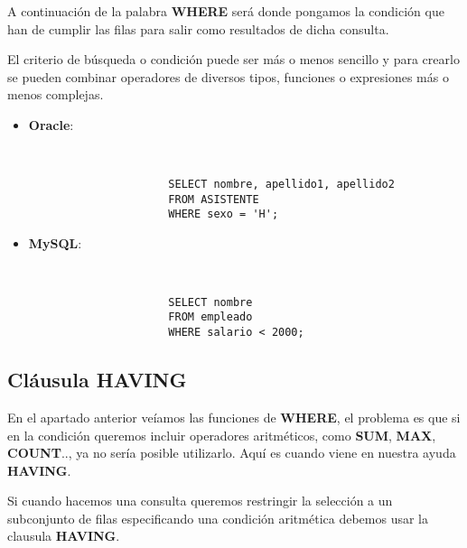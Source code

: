 A continuación de la palabra \textbf{WHERE} será donde pongamos la condición que han de cumplir las filas para salir  como resultados de dicha consulta.

El criterio de búsqueda o condición puede ser más o menos sencillo y para crearlo se pueden combinar operadores de diversos tipos, funciones o expresiones más o menos complejas.

\begin{itemize}
    \item \textbf{Oracle}:

    \begin{figure}[H]
        \begin{tcolorbox}[sharp corners, colback=yellow!30, colframe=white!20]
            \scriptsize
            \begin{verbatim}


                SELECT nombre, apellido1, apellido2
                FROM ASISTENTE
                WHERE sexo = 'H';
            \end{verbatim}
        \end{tcolorbox}
    \end{figure}

    \item \textbf{MySQL}:

    \begin{figure}[H]
        \begin{tcolorbox}[sharp corners, colback=yellow!30, colframe=white!20]
            \scriptsize
            \begin{verbatim}


                SELECT nombre
                FROM empleado
                WHERE salario < 2000;
            \end{verbatim}
        \end{tcolorbox}
    \end{figure}
\end{itemize}

\subsection{Cláusula HAVING}
En el apartado anterior veíamos las funciones de \textbf{WHERE}, el problema es que si en la condición queremos incluir operadores aritméticos, como \textbf{SUM}, \textbf{MAX}, \textbf{COUNT}.., ya no sería posible utilizarlo. Aquí es cuando viene en nuestra ayuda \textbf{HAVING}.

Si cuando hacemos una consulta queremos restringir la selección a un subconjunto de filas especificando una condición aritmética debemos usar la clausula \textbf{HAVING}.

